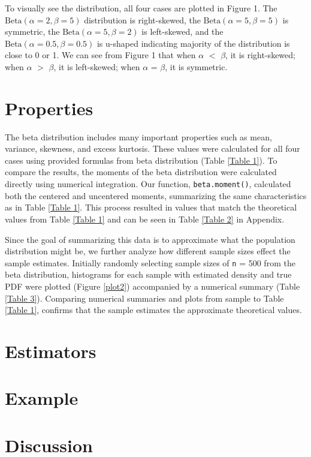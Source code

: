 \documentclass{article}\usepackage[]{graphicx}\usepackage[]{xcolor}
\begin{document}
\begin{multicols}{2}
To visually see the distribution, all four cases are plotted in Figure 1. The \(\text{Beta}(\alpha = 2, \beta = 5)\) distribution is right-skewed, the \(\text{Beta}(\alpha = 5, \beta = 5)\) is symmetric, the \(\text{Beta}(\alpha = 5, \beta = 2)\) is left-skewed, and the \(\text{Beta}(\alpha = 0.5, \beta = 0.5)\) is u-shaped indicating majority of the distribution is close to 0 or 1. We can see from Figure 1 that when \(\alpha\) \(<\) \(\beta\), it is right-skewed; when \(\alpha\) \(>\) \(\beta\), it is left-skewed; when \(\alpha\)  = \(\beta\), it is symmetric. 

\section{Properties}
The beta distribution includes many important properties such as mean, variance, skewness, and excess kurtosis. These values were calculated for all four cases using provided formulas from beta distribution (Table \ref{Table 1}). To compare the results, the moments of the beta distribution were calculated directly using numerical integration. Our function, \texttt{beta.moment()}, calculated both the centered and uncentered moments, summarizing the same characteristics as in Table \ref{Table 1}. This process resulted in values that match the theoretical values from Table \ref{Table 1} and can be seen in Table \ref{Table 2} in Appendix. 

Since the goal of summarizing this data is to approximate what the population distribution might be, we further analyze how different sample sizes effect the sample estimates. Initially randomly selecting sample sizes of \texttt{n} = 500 from the beta distribution, histograms for each sample with estimated density and true PDF were plotted (Figure \ref{plot2}) accompanied by a numerical summary (Table \ref{Table 3}). Comparing numerical summaries and plots from sample to Table \ref{Table 1}, confirms that the sample estimates the approximate theoretical values. 

\section{Estimators}

\section{Example}

\section{Discussion}



\end{multicols}
\end{document}
